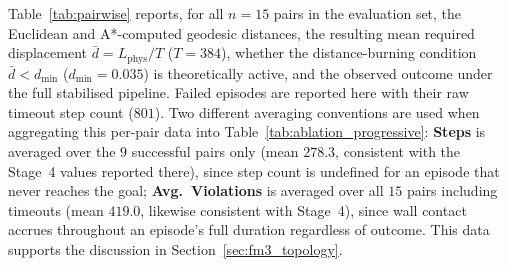 \documentclass[12pt, a4paper, oneside]{report}
\theoremstyle{definition}
\begin{document}
Table~\ref{tab:pairwise} reports, for all $n=15$ pairs in the
evaluation set, the Euclidean and A*-computed geodesic distances,
the resulting mean required displacement $\bar{d} = L_{\mathrm{phys}}/T$
($T=384$), whether the distance-burning condition
$\bar{d} < d_{\min}$ ($d_{\min}=0.035$) is theoretically active, and
the observed outcome under the full stabilised pipeline. Failed
episodes are reported here with their raw timeout step count
($801$). Two different averaging conventions are used when
aggregating this per-pair data into
Table~\ref{tab:ablation_progressive}: \textbf{Steps} is averaged
over the $9$ successful pairs only (mean $278.3$, consistent with
the Stage~4 values reported there), since step count is undefined
for an episode that never reaches the goal; \textbf{Avg.\
Violations} is averaged over all $15$ pairs including timeouts
(mean $419.0$, likewise consistent with Stage~4), since wall
contact accrues throughout an episode's full duration regardless of
outcome. This data supports the discussion in
Section~\ref{sec:fm3_topology}.
\end{document}
